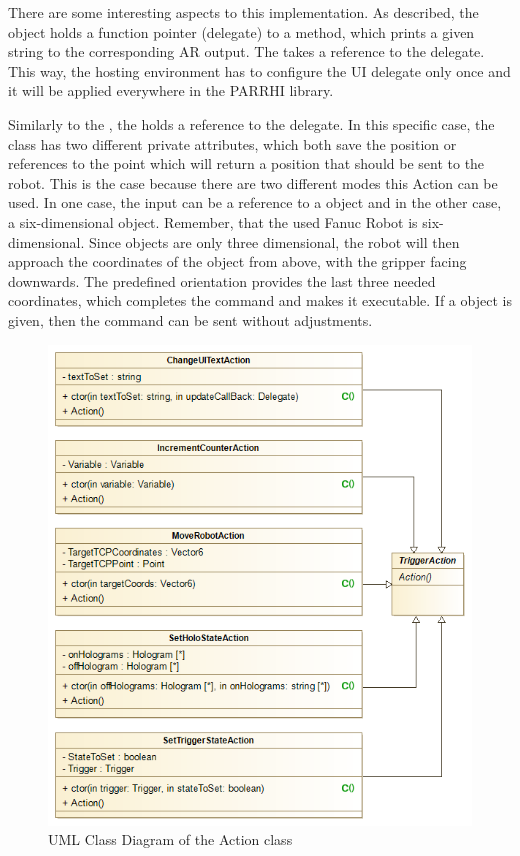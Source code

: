 There are some interesting aspects to this implementation. As described, the  object holds a function pointer (delegate) to a method, which prints a given string to the corresponding AR output. The  takes a reference to the  delegate. This way, the hosting environment has to configure the UI delegate only once and it will be applied everywhere in the PARRHI library.

Similarly to the , the  holds a reference to the  delegate. In this specific case, the class has two different private attributes, which both save the position or references to the point which will return a position that should be sent to the robot. This is the case because there are two different modes this Action can be used. In one case, the input can be a reference to a  object and in the other case, a six-dimensional  object. Remember, that the used Fanuc Robot is six-dimensional. Since  objects are only three dimensional, the robot will then approach the coordinates of the  object from above, with the gripper facing downwards. The predefined orientation provides the last three needed coordinates, which completes the command and makes it executable. If a  object is given, then the command can be sent without adjustments.

\begin{figure}[!th]
	\centering
	\includegraphics[width=0.7\linewidth]{Figures/Implementation_Action}
	\caption{UML Class Diagram of the Action class}
	\label{Fig:ImplementationAction}
\end{figure}

